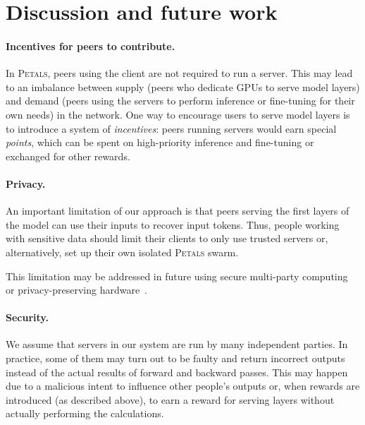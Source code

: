 \section{Discussion and future work}\label{sect:discussion}\label{sect:incentives}

\paragraph{Incentives for peers to contribute.}
In \textsc{Petals}, peers using the client are not required to run a server. This may lead to an imbalance between supply (peers who dedicate GPUs to serve model layers) and demand (peers using the servers to perform inference or fine-tuning for their own needs) in the network.
One way to encourage users to serve model layers is to introduce a system of \textit{incentives}: peers running servers would earn special \textit{points}, which can be spent on high-priority inference and fine-tuning or exchanged for other rewards.

\paragraph{Privacy.} An important limitation of our approach is that peers serving the first layers of the model can use their inputs to recover input tokens. Thus, people working with sensitive data should limit their clients to only use trusted servers or, alternatively, set up their own isolated \textsc{Petals} swarm.

This limitation may be addressed in future using secure multi-party computing~\citep{evans2018pragmatic} or privacy-preserving hardware~\citep{nvidia-privacy}.

\paragraph{Security.}
We assume that servers in our system are run by many independent parties. In practice, some of them may turn out to be faulty and return incorrect outputs instead of the actual results of forward and backward passes. This may happen due to a malicious intent to influence other people's outputs or, when rewards are introduced (as described above), to earn a reward for serving layers without actually performing the calculations.

